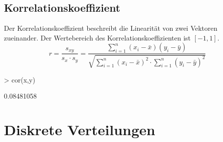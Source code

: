 \subsection{Korrelationskoeffizient}
Der Korrelationskoeffizient beschreibt die Linearität von zwei Vektoren 
zueinander. Der Wertebereich des Korrelationskoeffizienten ist $[-1, 1]$. 
\[ r = \frac{s_{xy}}{s_x \cdot s_y} 
= \frac{\sum\limits_{i=1}^{n} (x_i - \bar{x}) (y_i - \bar{y})}
{\sqrt{\sum\limits_{i=1}^{n} (x_i - \bar{x})^2  \cdot 
\sum\limits_{i=1}^{n} (y_i - \bar{y})^2 }} \]
\begin{Schunk}
\begin{Sinput}
> cor(x,y)
\end{Sinput}
\begin{Soutput}
[1] 0.08481058
\end{Soutput}
\end{Schunk}


\section{Diskrete Verteilungen}

